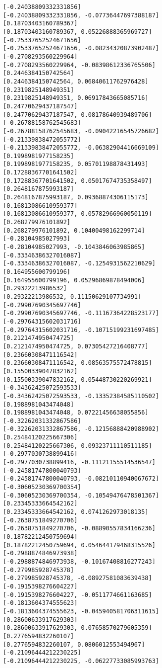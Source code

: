 \documentclass[11pt]{article}
\begin{document}
\begin{Verbatim}[commandchars=\\\{\}]
[-0.24038809332331856]
[-0.24038809332331856, -0.07736447697388187]
[0.18703403160789367]
[0.18703403160789367, 0.05226888365969727]
[-0.25337652524671656]
[-0.25337652524671656, -0.08234320873902487]
[-0.2708293560229964]
[-0.2708293560229964, -0.08398612336765506]
[0.2446384150742564]
[0.2446384150742564, 0.06840611762976428]
[0.2319825148949351]
[0.2319825148949351, 0.06917843665085716]
[0.24770629437187547]
[0.24770629437187547, 0.08178640939489706]
[-0.26788158762545683]
[-0.26788158762545683, -0.09042216545726682]
[-0.21339838472055772]
[-0.21339838472055772, -0.06382904416669109]
[0.1998981977158235]
[0.1998981977158235, 0.05701198878431493]
[0.17288367701641502]
[0.17288367701641502, 0.05017674735358497]
[0.2648167875993187]
[0.2648167875993187, 0.09368874306115173]
[0.16813086610959377]
[0.16813086610959377, 0.05782966960050119]
[0.268279976101892]
[0.268279976101892, 0.10400498162299714]
[-0.28104985027993]
[-0.28104985027993, -0.1043846063985865]
[-0.33346386327016087]
[-0.33346386327016087, -0.1254931562210629]
[0.164955600799196]
[0.164955600799196, 0.05296869878494006]
[0.29322213986532]
[0.29322213986532, 0.11150629107734991]
[-0.29907690345697746]
[-0.29907690345697746, -0.11167364228523177]
[-0.29764315602031716]
[-0.29764315602031716, -0.10715199231697485]
[0.2121474950474725]
[0.2121474950474725, 0.07305427216408777]
[0.23660308471116542]
[0.23660308471116542, 0.08563575572478815]
[0.15500339047832162]
[0.15500339047832162, 0.05448730220269921]
[-0.34362425072593533]
[-0.34362425072593533, -0.13352384585110502]
[0.1988981043474048]
[0.1988981043474048, 0.07221456638055856]
[-0.32262031332867586]
[-0.32262031332867586, -0.12156888420988902]
[0.25484120225667306]
[0.25484120225667306, 0.09323711110511185]
[-0.2977030738899416]
[-0.2977030738899416, -0.11121155514536547]
[-0.24581747800040793]
[-0.24581747800040793, -0.08210110940067672]
[-0.30605230369700354]
[-0.30605230369700354, -0.10549476478501367]
[0.23345333664542162]
[0.23345333664542162, 0.0741262973018135]
[-0.2638751849270706]
[-0.2638751849270706, -0.08890557834166236]
[0.18782212450759694]
[0.18782212450759694, 0.054644179468315526]
[-0.2988874846973938]
[-0.2988874846973938, -0.10167408816277243]
[-0.279985928745378]
[-0.279985928745378, -0.08927581083639438]
[-0.1915398276604227]
[-0.1915398276604227, -0.0511774661163685]
[-0.1813604374555623]
[-0.1813604374555623, -0.045940581706311615]
[0.28600633917629303]
[0.28600633917629303, 0.07658570279605359]
[0.2776594832260107]
[0.2776594832260107, 0.0806012553494967]
[-0.21096444212230225]
[-0.21096444212230225, -0.06227733085993763]

\end{Verbatim}
\end{document}

